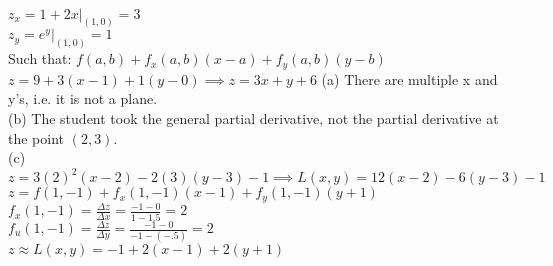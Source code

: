 \documentclass{article}
\begin{document}
  \sol
  \\$ z_x = 1+2x |_{(1,0)} = 3$
  \\ $z_y = e^y |_{(1,0)} = 1$
  \\Such that: $f(a,b) + f_x (a,b)(x-a)+f_y (a,b)(y-b)$
  \\$z = 9 + 3(x-1) + 1(y-0) \implies \boxed{z = 3x + y + 6}$
  \sol (a) There are multiple x and y's, i.e. it is not a plane.
  \\ (b) The student took the general partial derivative, not the partial derivative at the point $(2,3)$.
  \\ (c) $z = 3(2)^2(x-2) - 2(3)(y-3) - 1 \implies \boxed{L(x,y) = 12(x-2)-6(y-3) - 1}$
  \sol $z = f(1,-1) + f_x(1,-1)(x-1) + f_y(1,-1)(y+1)$
  \\ $f_x(1,-1) = \frac{\Delta z}{\Delta x} = \frac{-1-0}{1-1.5} = 2$
  \\ $f_u(1,-1) = \frac{\Delta z}{\Delta y} = \frac{-1-0}{-1-(-.5)} = 2$
  \\ $\boxed{z \approx L(x,y) = -1+2(x-1)+2(y+1)}$
\end{document}
